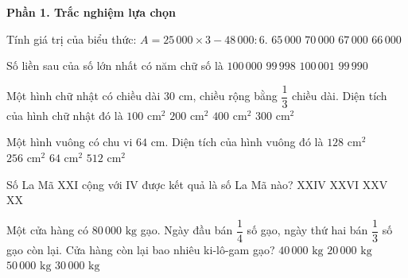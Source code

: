 \textbf{Phần 1. Trắc nghiệm lựa chọn}

\begin{ex} %
Tính giá trị của biểu thức: $A = 25\,000 \times 3 - 48\,000 : 6$.
\choice
{$65\,000$}
{$70\,000$}
{\True $67\,000$}
{$66\,000$}
\end{ex}

\begin{ex} %
Số liền sau của số lớn nhất có năm chữ số là
\choice
{\True $100\,000$}
{$99\,998$}
{$100\,001$}
{$99\,990$}
\end{ex}

\begin{ex} %
Một hình chữ nhật có chiều dài $30\text{ cm}$, chiều rộng bằng $\dfrac{1}{3}$ chiều dài. Diện tích của hình chữ nhật đó là
\choice
{$100\text{ cm}^2$}
{$200\text{ cm}^2$}
{$400\text{ cm}^2$}
{\True $300\text{ cm}^2$}
\end{ex}

\begin{ex} %
Một hình vuông có chu vi $64\text{ cm}$. Diện tích của hình vuông đó là
\choice
{$128\text{ cm}^2$}
{\True $256\text{ cm}^2$}
{$64\text{ cm}^2$}
{$512\text{ cm}^2$}
\end{ex}

\begin{ex} %
Số La Mã $\text{XXI}$ cộng với $\text{IV}$ được kết quả là số La Mã nào?
\choice
{$\text{XXIV}$}
{$\text{XXVI}$}
{\True $\text{XXV}$}
{$\text{XX}$}
\end{ex}

\begin{ex} %
Một cửa hàng có $80\,000\text{ kg}$ gạo. Ngày đầu bán $\dfrac{1}{4}$ số gạo, ngày thứ hai bán $\dfrac{1}{3}$ số gạo còn lại. Cửa hàng còn lại bao nhiêu ki-lô-gam gạo?
\choice
{\True $40\,000\text{ kg}$}
{$20\,000\text{ kg}$}
{$50\,000\text{ kg}$}
{$30\,000\text{ kg}$}
\end{ex}

